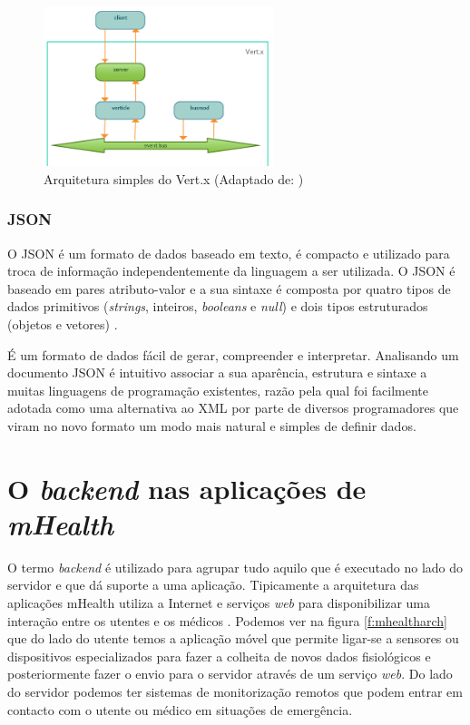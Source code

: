 \begin{figure}[H]
  \centering
  \includegraphics[width=0.6\textwidth]{imgs/vertx_arch.png}
  \caption[Arquitetura simples do Vert.x]{Arquitetura simples do Vert.x (Adaptado de: \cite{vertx-study})}
  \label{f:vertxarch}
\end{figure}


\subsubsection{JSON}
O \gls{JSON} é um formato de dados baseado em texto, é compacto e utilizado para troca de informação independentemente da linguagem a ser utilizada. O \gls{JSON} é baseado em pares atributo-valor e a sua sintaxe é composta por quatro tipos de dados primitivos (\textit{strings}, inteiros, \textit{booleans} e \textit{null}) e dois tipos estruturados (objetos e vetores) \cite{json}. 
\par
É um formato de dados  fácil de gerar, compreender e interpretar. Analisando um documento \gls{JSON} é intuitivo associar a sua aparência, estrutura e sintaxe a muitas linguagens de programação existentes, razão pela qual foi facilmente adotada como uma alternativa ao \gls{XML} por parte de diversos programadores que viram no novo formato um modo mais natural e simples de definir dados.



\newpage
\section{O \textit{backend} nas aplicações de \textit{mHealth}}
O termo \textit{backend} é utilizado para agrupar tudo aquilo que é executado no lado do servidor e que dá suporte a uma aplicação. Tipicamente a arquitetura das aplica\c c\~oes mHealth utiliza a Internet e serviços \textit{web} para disponibilizar uma intera\c c\~ao entre os utentes e os m\'edicos \cite{mhealth}. Podemos ver na figura \ref{f:mhealtharch} que do lado do utente temos a aplicação móvel que permite ligar-se a sensores ou dispositivos especializados para fazer a colheita de novos dados fisiológicos e posteriormente fazer o envio para o servidor através de um serviço \textit{web}. Do lado do servidor podemos ter sistemas de monitorização remotos que podem entrar em contacto com o utente ou médico em situações de emergência.

